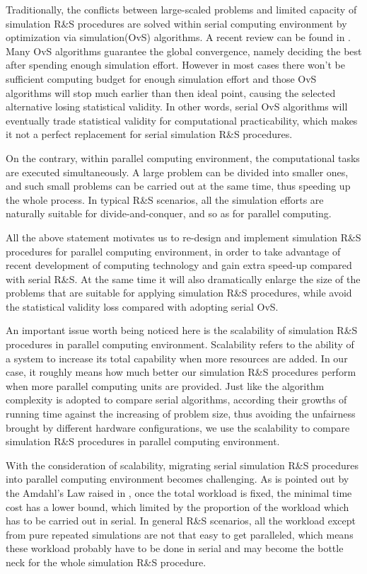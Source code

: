 Traditionally, the conflicts between large-scaled problems and limited capacity of simulation R\&S procedures are solved within serial computing environment by optimization via simulation(OvS) algorithms. A recent review can be found in \cite{potwsc09ovs}. Many OvS algorithms guarantee the global convergence, namely deciding the best after spending enough simulation effort. However in most cases there won't be sufficient computing budget for enough simulation effort and those OvS algorithms will stop much earlier than then ideal point, causing the selected alternative losing statistical validity. In other words, serial OvS algorithms will eventually trade statistical validity for computational practicability, which makes it not a perfect replacement for serial simulation R\&S procedures.

On the contrary, within parallel computing environment, the computational tasks are executed simultaneously. A large problem can be divided into smaller ones, and such small problems can be carried out at the same time, thus speeding up the whole process. In typical R\&S scenarios, all the simulation efforts are naturally suitable for divide-and-conquer, and so as for parallel computing.

All the above statement motivates us to re-design and implement simulation R\&S procedures for parallel computing environment, in order to take advantage of recent development of computing technology and gain extra speed-up compared with serial R\&S. At the same time it will also dramatically enlarge the size of the problems that are suitable for applying simulation R\&S procedures, while avoid the statistical validity loss compared with adopting serial OvS.

An important issue worth being noticed here is the scalability of simulation R\&S procedures in parallel computing environment. Scalability refers to the ability of a system to increase its total capability when more resources are added. In our case, it roughly means how much better our simulation R\&S procedures perform when more parallel computing units are provided. Just like the algorithm complexity is adopted to compare serial algorithms, according their growths of running time against the increasing of problem size, thus avoiding the unfairness brought by different hardware configurations, we use the scalability to compare simulation R\&S procedures in parallel computing environment.

With the consideration of scalability, migrating serial simulation R\&S procedures into parallel computing environment becomes challenging. As is pointed out by the Amdahl's Law raised in \cite{amdahl}, once the total workload is fixed, the minimal time cost has a lower bound, which limited by the proportion of the workload which has to be carried out in serial. In general R\&S scenarios, all the workload except from pure repeated simulations are not that easy to get paralleled, which means these workload probably have to be done in serial and may become the bottle neck for the whole simulation R\&S procedure.

